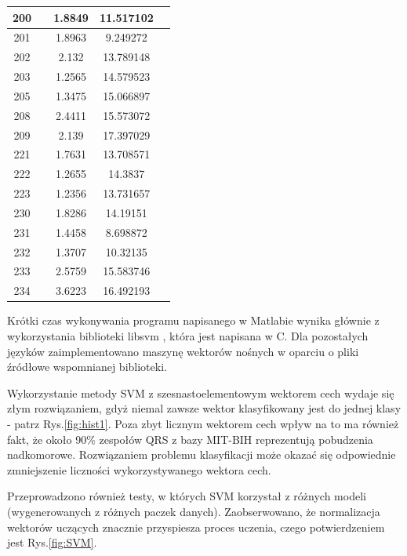 \begin{table}[!tp]
\begin{longtable}{|c|c|c|c|c|}
		200 & & 1.8849 & 11.517102 & \\ \hline
		201 & & 1.8963 &  9.249272 & \\ \hline
		202 & & 2.132  & 13.789148 & \\ \hline
		203 & & 1.2565 & 14.579523 & \\ \hline
		205 & & 1.3475 & 15.066897 & \\ \hline
		208 & & 2.4411 & 15.573072 & \\ \hline
		209 & & 2.139  & 17.397029 & \\ \hline
		221 & & 1.7631 & 13.708571 & \\ \hline
		222 & & 1.2655 & 14.3837   & \\ \hline
		223 & & 1.2356 & 13.731657 & \\ \hline
		230 & & 1.8286 & 14.19151  & \\ \hline
		231 & & 1.4458 &  8.698872 & \\ \hline
		232 & & 1.3707 & 10.32135  & \\ \hline
		233 & & 2.5759 & 15.583746 & \\ \hline
		234 & & 3.6223 & 16.492193 & \\ \hline
	\end{longtable}
\end{table}

Krótki czas wykonywania programu napisanego w Matlabie wynika głównie z wykorzystania biblioteki libsvm \cite{csie}, która jest napisana w C. Dla pozostałych języków zaimplementowano maszynę wektorów nośnych w oparciu o pliki źródłowe wspomnianej biblioteki.

Wykorzystanie metody SVM z szesnastoelementowym wektorem cech wydaje się złym rozwiązaniem, gdyż niemal zawsze wektor klasyfikowany jest do jednej klasy - patrz Rys.\ref{fig:hist1}. Poza zbyt licznym wektorem cech wpływ na to ma również fakt, że około 90\% zespołów QRS z bazy MIT-BIH reprezentują pobudzenia nadkomorowe. Rozwiązaniem problemu klasyfikacji może okazać się odpowiednie zmniejszenie liczności wykorzystywanego wektora cech.

Przeprowadzono również testy, w których SVM korzystał z różnych modeli (wygenerowanych z różnych paczek danych). Zaobserwowano, że normalizacja wektorów uczących znacznie przyspiesza proces uczenia, czego potwierdzeniem jest Rys.\ref{fig:SVM}.

